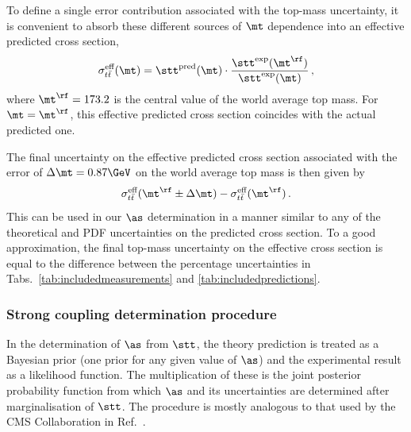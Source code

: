 To define a single error contribution associated with the
top-mass uncertainty, it is convenient to absorb these different
sources of $\mt$ dependence into an effective predicted cross section,
\begin{equation}
  \label{eq:eff-mtop-dep}
\sigma_{t\bar{t}}^{\text{eff}}(\mt) = 
    \stt^{\text{pred}} (  \mt  ) \cdot 
        \frac{
            \stt^{\text{exp}} (  \mt^\rf  )
            }{
            \stt^{\text{exp}} (  \mt  )
            }\,,
\end{equation}
where $\mt^\rf = 173.2$ is the central value of the world average top
mass.
%
For $\mt = \mt^\rf$, this effective predicted cross section coincides
with the actual predicted one.

The final uncertainty on the effective predicted cross section
associated with the error of $\Delta \mt = 0.87\GeV$ on the world
average top mass is then given by
\begin{equation}
  \label{eq:mtop-uncertainty-impact}
  \sigma_{t\bar{t}}^{\text{eff}}(\mt^\rf \pm \Delta \mt) - 
  \sigma_{t\bar{t}}^{\text{eff}}(\mt^\rf)\,.
\end{equation}
This can be used in our $\as$ determination in a manner similar to
any of the theoretical and PDF uncertainties on the predicted cross
section.
% 
To a good approximation, the final top-mass uncertainty on the
effective cross section is equal to the difference between the
percentage uncertainties in Tabs.~\ref{tab:includedmeasurements} and
\ref{tab:includedpredictions}.
%

\subsubsection{Strong coupling determination procedure}
\label{sec:determination-procedure}

In the determination of $\as$ from $\stt$, the theory prediction is
treated as a Bayesian prior (one prior for any given value of $\as$)
and the experimental result as a likelihood function.  The
multiplication of these is the joint posterior probability function
from which $\as$ and its uncertainties are determined after
marginalisation of $\stt$.  The procedure is mostly analogous to that
used by the CMS Collaboration in Ref.~\cite{Chatrchyan:2013haa}.

